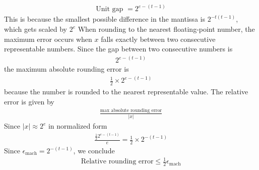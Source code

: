 \documentclass{report}
\begin{document}
\begin{itemize}
                \begin{align*}
                    \text{Unit gap } = 2^{e-(t-1)}
                \end{align*}
                \bigbreak \noindent 
                This is because the smallest possible difference in the mantissa is $2^{-t(t-1)} $, which gets scaled by $2^{e} $
                \bigbreak \noindent 
                When rounding to the nearest floating-point number, the maximum error occurs when $x$ falls exactly between two consecutive representable numbers.
                \bigbreak \noindent 
                Since the gap between two consecutive numbers is
                \begin{align*}
                    2^{e-(t-1)}
                \end{align*}
                the maximum absolute rounding error is
                \begin{align*}
                    \frac{1}{2} \times 2^{e-(t-1)}
                \end{align*}
                because the number is rounded to the nearest representable value.
                \bigbreak \noindent 
                The relative error is given by
                \begin{align*}
                    \frac{\text{max absolute rounding error}}{\left\lvert x \right\rvert}
                \end{align*}
                Since $\left\lvert x \right\rvert \approx  2^{e}$ in normalized form
                \begin{align*}
                    \frac{\frac{1}{2}2^{e-(t-1)}}{e} = \frac{1}{2} \times 2^{-(t-1)}
                \end{align*}
                Since $\epsilon_{\text{mach}} =2^{-(t-1)}$, we conclude
                \begin{align*}
                    \text{Relative rounding error} \leq \frac{1}{2}\epsilon_{\text{mach}}
                \end{align*}








\end{itemize}
\end{document}
